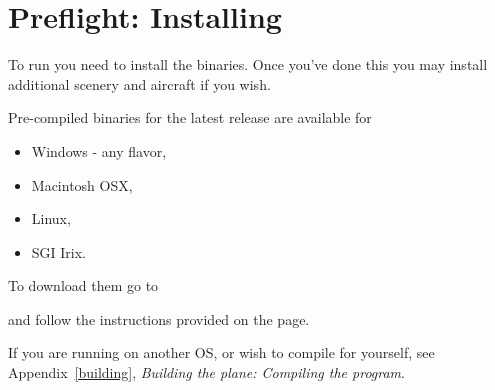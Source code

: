 
\chapter{Preflight: Installing \FlightGear{} \label{prefligh}}

To run \FlightGear{} you need to install the binaries. Once you've done this you may install additional scenery and aircraft if you wish.

Pre-compiled binaries for the latest release are available for 

\begin{itemize}
\item Windows - any flavor,
\item Macintosh OSX,
\item Linux,
\item SGI Irix.
\end{itemize}

To download them go to 

\medskip
{}
\medskip

and follow the instructions provided on the page.

If you are running on another OS, or wish to compile for yourself, see Appendix~\ref{building}, \textit{Building the plane: Compiling the program}.

